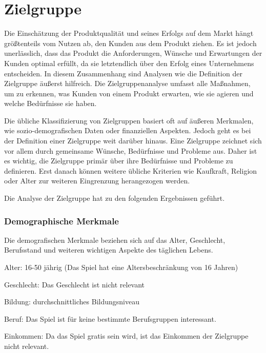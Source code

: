 
\section{Zielgruppe}\label{sec:zielgruppe}

\renewcommand{\kapitelautor}{Autor: Nils Hubmann}

%
Die Einschätzung der Produktqualität und seines Erfolgs auf dem Markt hängt größtenteils vom Nutzen ab, den Kunden aus dem Produkt ziehen.
Es ist jedoch unerlässlich, dass das Produkt die Anforderungen, Wünsche und Erwartungen der Kunden optimal erfüllt, da sie letztendlich über den Erfolg eines Unternehmens entscheiden.
In diesem Zusammenhang sind Analysen wie die Definition der Zielgruppe äußerst hilfreich.
Die Zielgruppenanalyse umfasst alle Maßnahmen, um zu erkennen, was Kunden von einem Produkt erwarten, wie sie agieren und welche Bedürfnisse sie haben.


Die übliche Klassifizierung von Zielgruppen basiert oft auf äußeren Merkmalen, wie sozio-demografischen Daten oder finanziellen Aspekten.
Jedoch geht es bei der Definition einer Zielgruppe weit darüber hinaus.
Eine Zielgruppe zeichnet sich vor allem durch gemeinsame Wünsche, Bedürfnisse und Probleme aus.
Daher ist es wichtig, die Zielgruppe primär über ihre Bedürfnisse und Probleme zu definieren.
Erst danach können weitere übliche Kriterien wie Kaufkraft, Religion oder Alter zur weiteren Eingrenzung herangezogen werden. 

Die Analyse der Zielgruppe hat zu den folgenden Ergebnissen geführt.

\subsubsection{Demographische Merkmale}\label{subsubsec:Demographische-Merkmale}

Die demografischen Merkmale beziehen sich auf das Alter, Geschlecht, Berufsstand und weiteren wichtigen Aspekte des täglichen Lebens.

\begin{liste}
    \item Alter: 16-50 jährig (Das Spiel hat eine Altersbeschränkung von 16 Jahren)
    \item Geschlecht: Das Geschlecht ist nicht relevant
    \item Bildung: durchschnittliches Bildungsniveau
    \item Beruf: Das Spiel ist für keine bestimmte Berufsgruppen interessant.
    \item Einkommen: Da das Spiel gratis sein wird, ist das Einkommen der Zielgruppe nicht relevant.
\end{liste}

